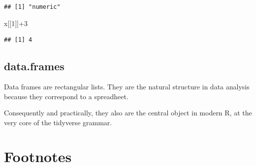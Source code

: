 \documentclass[
]{book}
\newenvironment{Shaded}{\begin{snugshade}}{\end{snugshade}}
\newcommand{\DecValTok}[1]{\textcolor[rgb]{0.00,0.00,0.81}{#1}}
\newcommand{\NormalTok}[1]{#1}
\newcommand{\SpecialCharTok}[1]{\textcolor[rgb]{0.00,0.00,0.00}{#1}}
\begin{document}
\begin{verbatim}
## [1] "numeric"
\end{verbatim}

\begin{Shaded}
\begin{Highlighting}[]
\NormalTok{x[[}\DecValTok{1}\NormalTok{]]}\SpecialCharTok{+}\DecValTok{3}
\end{Highlighting}
\end{Shaded}

\begin{verbatim}
## [1] 4
\end{verbatim}

\hypertarget{data.frames}{%
\subsection{data.frames}\label{data.frames}}

Data frames are rectangular lists. They are the natural structure in data analysis because they correspond to a spreadheet.

Consequently and practically, they also are the central object in modern R, at the very core of the tidyverse grammar.

\hypertarget{footnotes}{%
\section{Footnotes}\label{footnotes}}

  
\end{document}
